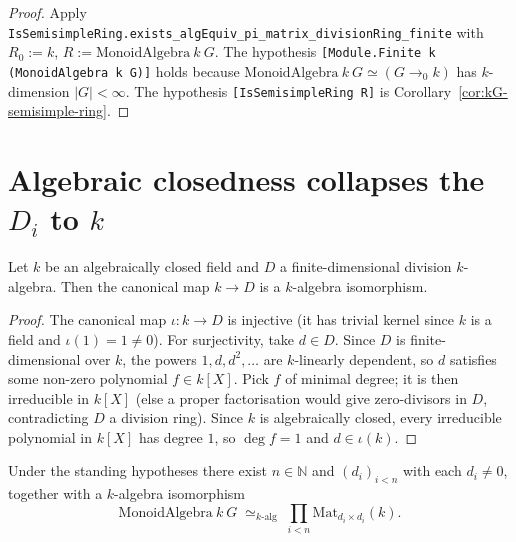 \begin{proof}\leanok
  Apply
  \texttt{IsSemisimpleRing.exists\_algEquiv\_pi\_matrix\_divisionRing\_finite}
  with $R_0 := k$, $R := \mathrm{MonoidAlgebra}\ k\ G$. The hypothesis
  \texttt{[Module.Finite k (MonoidAlgebra k G)]} holds because
  $\mathrm{MonoidAlgebra}\ k\ G \simeq (G \to_{\!0\!} k)$ has $k$-dimension
  $|G| < \infty$. The hypothesis \texttt{[IsSemisimpleRing R]} is
  Corollary~\ref{cor:kG-semisimple-ring}.
\end{proof}

\section{Algebraic closedness collapses the $D_i$ to $k$}

\begin{lemma}
  \label{lem:divalg-of-isAlgClosed}
  Let $k$ be an algebraically closed field and $D$ a finite-dimensional
  division $k$-algebra. Then the canonical map $k \to D$ is a $k$-algebra
  isomorphism.
\end{lemma}

\begin{proof}
  The canonical map $\iota : k \to D$ is injective (it has trivial kernel
  since $k$ is a field and $\iota(1) = 1 \ne 0$). For surjectivity, take
  $d \in D$. Since $D$ is finite-dimensional over $k$, the powers
  $1, d, d^2, \ldots$ are $k$-linearly dependent, so $d$ satisfies some non-zero
  polynomial $f \in k[X]$. Pick $f$ of minimal degree; it is then irreducible
  in $k[X]$ (else a proper factorisation would give zero-divisors in $D$,
  contradicting $D$ a division ring). Since $k$ is algebraically closed,
  every irreducible polynomial in $k[X]$ has degree $1$, so $\deg f = 1$ and
  $d \in \iota(k)$.
\end{proof}

\begin{theorem}
  \label{thm:peter-weyl-ring}
  Under the standing hypotheses there exist $n \in \mathbb N$ and
  $(d_i)_{i < n}$ with each $d_i \ne 0$, together with a $k$-algebra
  isomorphism
  \[
     \mathrm{MonoidAlgebra}\ k\ G \;\simeq_{k\text{-alg}}\;
     \prod_{i < n} \mathrm{Mat}_{d_i \times d_i}(k).
  \]
\end{theorem}


